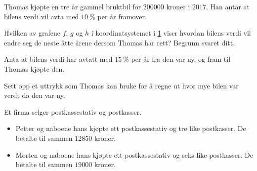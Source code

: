 \Oppgave[2] %

Thomas kjøpte en tre år gammel bruktbil for $\num{200000}$ kroner i $2017$. Han
antar at bilens verdi vil avta med  $\SI{10}{\percent}$ per år framover.

\begin{oppgaver}
     Hvilken av grafene $f$, $g$ og $h$ i koordinatsystemet i
    \cref{fig:del-1-oppgave-6} viser hvordan bilens verdi vil endre seg de neste
    åtte årene dersom Thomas har rett?
    Begrunn svaret ditt.
\end{oppgaver}

\begin{figure}[H]
  \caption{}
  \label{fig:del-1-oppgave-6}
\end{figure}

Anta at bilens verdi har avtatt med $\SI{15}{\percent}$ per år fra den var ny,
og fram til Thomas kjøpte den.

\begin{oppgaver}
     Sett opp et uttrykk som Thomas kan bruke for å regne ut hvor mye
    bilen var verdt da den var ny.
\end{oppgaver}


\Oppgave[4] %

Et firma selger postkassestativ og postkasser.

\begin{itemize}
    \item Petter og naboene hans kjøpte ett postkassestativ og tre like
      postkasser. De betalte til sammen $\num{12850}$ kroner.
    \item Morten og naboene hans kjøpte ett postkassestativ og seks like
      postkasser. De betalte til sammen $\num{19000}$ kroner.
\end{itemize}

